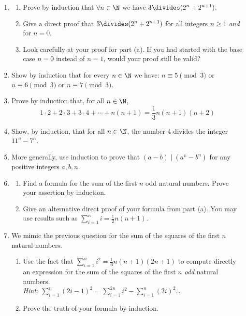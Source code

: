 \begin{enumerate}
  \item\begin{enumerate}
    \item Prove by induction that $\forall n\in\N$ we have $3\divides(2^n+2^{n+1})$.
    \item Give a direct proof that $3\divides(2^n+2^{n+1})$ for all integers $n\ge 1$ \emph{and} for $n=0$.
    \item Look carefully at your proof for part (a). If you had started with the base case $n=0$ instead of $n=1$, would your proof still be valid?
  \end{enumerate}
  
	\item Show by induction that for every $n\in\N$ we have: $n\equiv 5\pmod 3$ or $n\equiv 6\pmod 3$ or $n\equiv 7\pmod 3$.
	
	\item Prove by induction that, for all $n\in\N$,
	\[1\cdot 2+2\cdot 3+3\cdot 4+\cdots +n(n+1)=\frac 13n(n+1)(n+2)\]

	\item Show, by induction, that for all $n\in\N$, the number 4 divides the integer $11^n-7^n$.
	
	\item More generally, use induction to prove that $(a-b)\mid (a^n-b^n)$ for any positive integers $a,b,n$.
	
	\item\begin{enumerate}
    \item Find a formula for the sum of the first $n$ odd natural numbers. Prove your assertion by induction.
		\item Give an alternative direct proof of your formula from part (a). You may use results such as $\sum\limits_{i=1}^ni=\frac 12n(n+1)$.
  \end{enumerate}
  
	\item We mimic the previous question for the sum of the squares of the first $n$ natural numbers.
	\begin{enumerate}
    \item Use the fact that $\sum\limits_{i=1}^ni^2=\frac 16n(n+1)(2n+1)$ to compute directly an expression for the sum of the squares of the first $n$ \emph{odd} natural numbers.\\
    \emph{Hint: $\sum\limits_{i=1}^n(2i-1)^2=\sum\limits_{i=1}^{2n}i^2-\sum\limits_{i=1}^n(2i)^2$\ldots}
		\item Prove the truth of your formula by induction.
  \end{enumerate}
  

\end{enumerate}
